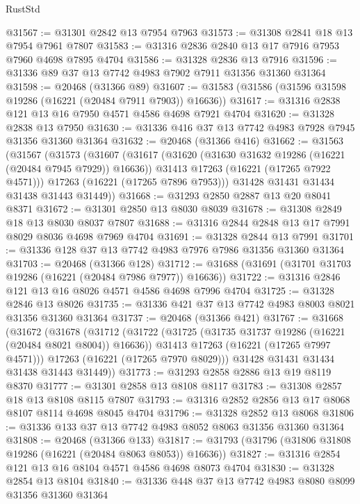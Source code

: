 \begin{lexlean}{RustStd}
\begin{coremodule}
@31567 := @31301 @2842 @13 @7954 @7963
@31573 := @31308 @2841 @18 @13 @7954 @7961 @7807
@31583 := @31316 @2836 @2840 @13 @17 @7916 @7953 @7960 @4698 @7895 @4704
@31586 := @31328 @2836 @13 @7916
@31596 := @31336 @89 @37 @13 @7742 @4983 @7902 @7911 @31356 @31360 @31364
@31598 := @20468 (@31366 @89)
@31607 := @31583 (@31586 (@31596 @31598 @19286 (@16221 (@20484 @7911 @7903)) @16636))
@31617 := @31316 @2838 @121 @13 @16 @7950 @4571 @4586 @4698 @7921 @4704
@31620 := @31328 @2838 @13 @7950
@31630 := @31336 @416 @37 @13 @7742 @4983 @7928 @7945 @31356 @31360 @31364
@31632 := @20468 (@31366 @416)
@31662 := @31563
    (@31567
      (@31573
        (@31607
          (@31617
            (@31620 (@31630 @31632 @19286 (@16221 (@20484 @7945 @7929)) @16636))
            @31413
            @17263
            (@16221 (@17265 @7922 @4571)))
          @17263
          (@16221 (@17265 @7896 @7953)))
        @31428
        @31431
        @31434
        @31438
        @31443
        @31449))
@31668 := @31293 @2850 @2887 @13 @20 @8041 @8371
@31672 := @31301 @2850 @13 @8030 @8039
@31678 := @31308 @2849 @18 @13 @8030 @8037 @7807
@31688 := @31316 @2844 @2848 @13 @17 @7991 @8029 @8036 @4698 @7969 @4704
@31691 := @31328 @2844 @13 @7991
@31701 := @31336 @128 @37 @13 @7742 @4983 @7976 @7986 @31356 @31360 @31364
@31703 := @20468 (@31366 @128)
@31712 := @31688 (@31691 (@31701 @31703 @19286 (@16221 (@20484 @7986 @7977)) @16636))
@31722 := @31316 @2846 @121 @13 @16 @8026 @4571 @4586 @4698 @7996 @4704
@31725 := @31328 @2846 @13 @8026
@31735 := @31336 @421 @37 @13 @7742 @4983 @8003 @8021 @31356 @31360 @31364
@31737 := @20468 (@31366 @421)
@31767 := @31668
    (@31672
      (@31678
        (@31712
          (@31722
            (@31725 (@31735 @31737 @19286 (@16221 (@20484 @8021 @8004)) @16636))
            @31413
            @17263
            (@16221 (@17265 @7997 @4571)))
          @17263
          (@16221 (@17265 @7970 @8029)))
        @31428
        @31431
        @31434
        @31438
        @31443
        @31449))
@31773 := @31293 @2858 @2886 @13 @19 @8119 @8370
@31777 := @31301 @2858 @13 @8108 @8117
@31783 := @31308 @2857 @18 @13 @8108 @8115 @7807
@31793 := @31316 @2852 @2856 @13 @17 @8068 @8107 @8114 @4698 @8045 @4704
@31796 := @31328 @2852 @13 @8068
@31806 := @31336 @133 @37 @13 @7742 @4983 @8052 @8063 @31356 @31360 @31364
@31808 := @20468 (@31366 @133)
@31817 := @31793 (@31796 (@31806 @31808 @19286 (@16221 (@20484 @8063 @8053)) @16636))
@31827 := @31316 @2854 @121 @13 @16 @8104 @4571 @4586 @4698 @8073 @4704
@31830 := @31328 @2854 @13 @8104
@31840 := @31336 @448 @37 @13 @7742 @4983 @8080 @8099 @31356 @31360 @31364

\end{coremodule}
\end{lexlean}
